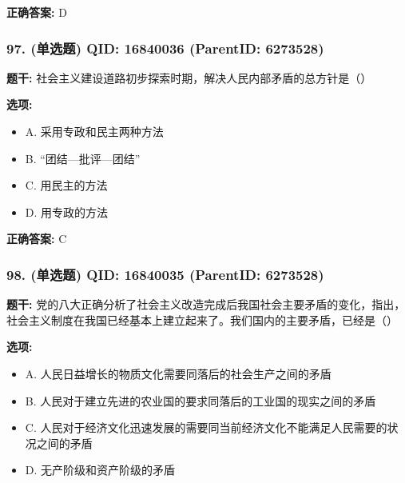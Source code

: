 \documentclass[12pt,UTF8]{ctexart}
\begin{document}
\textbf{正确答案:}
D

\vspace{0.3em}\hrulefill\vspace{0.7em}

\subsubsection*{97. (单选题) \small QID: 16840036 (ParentID: 6273528)}

\textbf{题干:}
社会主义建设道路初步探索时期，解决人民内部矛盾的总方针是（）



\textbf{选项:}
\begin{itemize}[leftmargin=*]

  \item A. 采用专政和民主两种方法

  \item B. “团结—批评—团结”

  \item C. 用民主的方法

  \item D. 用专政的方法

\end{itemize}

\textbf{正确答案:}
C

\vspace{0.3em}\hrulefill\vspace{0.7em}

\subsubsection*{98. (单选题) \small QID: 16840035 (ParentID: 6273528)}

\textbf{题干:}
党的八大正确分析了社会主义改造完成后我国社会主要矛盾的变化，指出，社会主义制度在我国已经基本上建立起来了。我们国内的主要矛盾，已经是（）



\textbf{选项:}
\begin{itemize}[leftmargin=*]

  \item A. 人民日益增长的物质文化需要同落后的社会生产之间的矛盾

  \item B. 人民对于建立先进的农业国的要求同落后的工业国的现实之间的矛盾

  \item C. 人民对于经济文化迅速发展的需要同当前经济文化不能满足人民需要的状况之间的矛盾

  \item D. 无产阶级和资产阶级的矛盾

\end{itemize}
\end{document}

